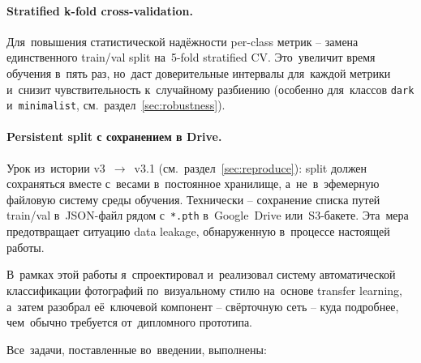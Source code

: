 \documentclass[a4paper,12pt]{diplom}
\begin{document}
\paragraph{Stratified k-fold cross-validation.} Для~повышения статистической надёжности per-class метрик -- замена единственного train/val split на~5-fold stratified CV. Это~увеличит время обучения в~пять раз, но~даст доверительные интервалы для~каждой метрики и~снизит чувствительность к~случайному разбиению (особенно для~классов \texttt{dark} и~\texttt{minimalist}, см.~раздел~\ref{sec:robustness}).

\paragraph{Persistent split с сохранением в Drive.} Урок из~истории v3~$\to$~v3.1 (см.~раздел~\ref{sec:reproduce}): split должен сохраняться вместе с~весами в~постоянное хранилище, а~не~в~эфемерную файловую систему среды обучения. Технически -- сохранение списка путей train/val в~JSON-файл рядом с~\verb|*.pth| в~Google~Drive или~S3-бакете. Эта~мера предотвращает ситуацию data leakage, обнаруженную в~процессе настоящей работы.


В~рамках этой работы я~спроектировал и~реализовал систему автоматической классификации фотографий по~визуальному стилю на~основе transfer learning, а~затем разобрал её~ключевой компонент -- свёрточную сеть -- куда подробнее, чем~обычно требуется от~дипломного прототипа.

Все~задачи, поставленные во~введении, выполнены:
\end{document}
